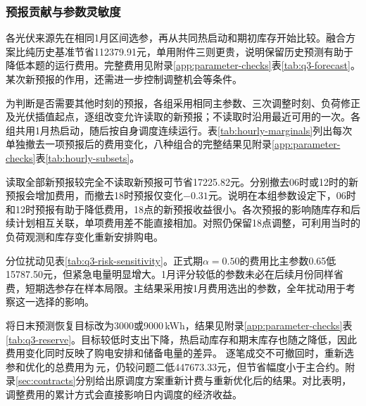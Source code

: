 \subsubsection{预报贡献与参数灵敏度}
各光伏来源先在相同1月区间选参，再从共同热启动和期初库存开始比较。融合方案比纯历史基准节省112379.91元，单用附件三则更贵，说明保留历史预测有助于降低本题的运行费用。完整费用见附录\ref{app:parameter-checks}表\ref{tab:q3-forecast}。某次新预报的作用，还需进一步控制调整机会等条件。

为判断是否需要其他时刻的预报，各组采用相同主参数、三次调整时刻、负荷修正及光伏插值起点，逐组改变允许读取的新预报；不读取时沿用最近可用的一次。各组共用1月热启动，随后按自身调度连续运行。表\ref{tab:hourly-marginals}列出每次单独撤去一项预报后的费用变化，八种组合的完整结果见附录\ref{app:parameter-checks}表\ref{tab:hourly-subsets}。

\FloatBarrier
读取全部新预报较完全不读取新预报可节省17225.82元。分别撤去06时或12时的新预报会增加费用，而撤去18时预报仅变化$-0.31$元。说明在本组参数设定下，06时和12时预报有助于降低费用，18点的新预报收益很小。各次预报的影响随库存和后续计划相互关联，单项费用差不能直接相加。对照仍保留18点调整，可利用当时的负荷观测和库存变化重新安排购电。

分位扰动见表\ref{tab:q3-risk-sensitivity}。正式期$\alpha=0.50$的费用比主参数0.65低15787.50元，但紧急电量明显增大。1月评分较低的参数未必在后续月份同样省费，短期选参存在样本局限。主结果采用按1月费用选出的参数，全年扰动用于考察这一选择的影响。

将日末预测恢复目标改为3000或9000\,kWh，结果见附录\ref{app:parameter-checks}表\ref{tab:q3-reserve}。目标较低时支出下降，热启动库存和期末库存也随之降低，因此费用变化同时反映了购电安排和储备电量的差异。
\FloatBarrier
逐笔成交不可撤回时，重新选参和优化的总费用为\,元，仍较问题二低447673.33元，但节省幅度小于主合约。附录\ref{sec:contracts}分别给出原调度方案重新计费与重新优化后的结果。对比表明，调整费用的累计方式会直接影响日内调度的经济收益。
\label{end:q3}
